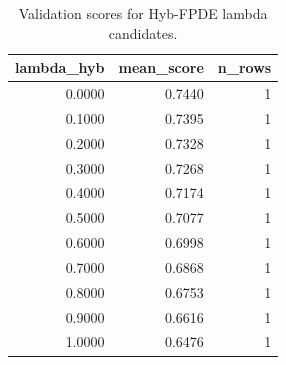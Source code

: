 \begin{table}[t]
\caption{Validation scores for Hyb-FPDE lambda candidates.}
\label{tab:lambda_distribution_computed}
\centering
\begin{tabular}{rrr}
\toprule
lambda\_hyb & mean\_score & n\_rows \\
\midrule
0.0000 & 0.7440 & 1 \\
0.1000 & 0.7395 & 1 \\
0.2000 & 0.7328 & 1 \\
0.3000 & 0.7268 & 1 \\
0.4000 & 0.7174 & 1 \\
0.5000 & 0.7077 & 1 \\
0.6000 & 0.6998 & 1 \\
0.7000 & 0.6868 & 1 \\
0.8000 & 0.6753 & 1 \\
0.9000 & 0.6616 & 1 \\
1.0000 & 0.6476 & 1 \\
\bottomrule
\end{tabular}

\end{table}
